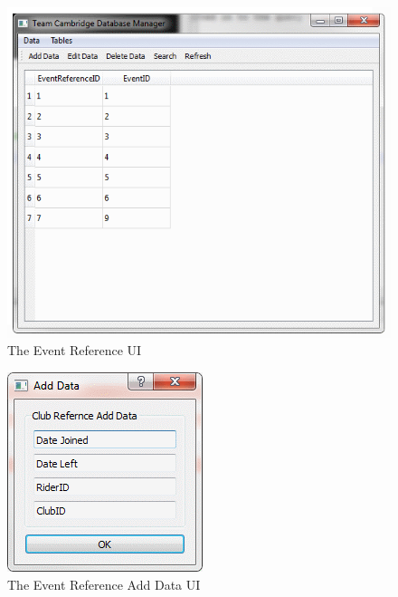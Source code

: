 \clearpage

\begin{figure}
\includegraphics[width=\textwidth]{./Maintenance/UI/EventRef.png}
\caption{The Event Reference UI} \label{fig:EventRef_UI}
\end{figure}

\begin{figure}
\includegraphics[width=\textwidth]{./Maintenance/UI/EventRefAD.png}
\caption{The Event Reference Add Data UI} \label{fig:EventRefAD_UI}
\end{figure}

